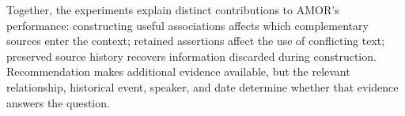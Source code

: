 Together, the experiments explain distinct contributions to AMOR's performance: constructing useful associations affects which complementary sources enter the context; retained assertions affect the use of conflicting text; preserved source history recovers information discarded during construction.
Recommendation makes additional evidence available, but the relevant relationship, historical event, speaker, and date determine whether that evidence answers the question.

